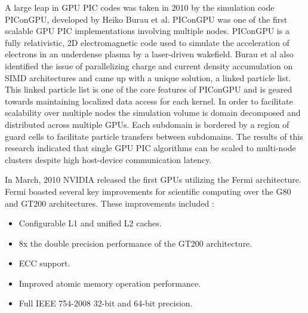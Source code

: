 A large leap in GPU PIC codes was taken in 2010 by the simulation code PIConGPU, developed by Heiko Burau et al. PIConGPU was one of the first scalable GPU PIC implementations involving multiple nodes. PIConGPU is a fully relativistic, 2D electromagnetic code used to simulate the acceleration of electrons in an underdense plasma by a laser-driven wakefield. Burau et al also identified the issue of parallelizing charge and current density accumulation on SIMD architectures and came up with a unique solution, a linked particle list. This linked particle list is one of the core features of PIConGPU and is geared towards maintaining localized data access for each kernel. In order to facilitate scalability over multiple nodes the simulation volume is domain decomposed and distributed across multiple GPUs. Each subdomain is bordered by a region of guard cells to facilitate particle transfers between subdomains. The results of this research indicated that single GPU PIC algorithms can be scaled to multi-node clusters despite high host-device communication latency.\cite{Burau2010}

In March, 2010 NVIDIA released the first GPUs utilizing the Fermi architecture. Fermi boasted several key improvements for scientific computing over the G80 and GT200 architectures. These improvements included \cite{NVIDIACorporation2009}:

\begin{itemize}
\singlespacing
\item Configurable L1 and unified L2 caches.
\item 8x the double precision performance of the GT200 architecture. 
\item ECC support. 
\item Improved atomic memory operation performance.
\item Full IEEE 754-2008 32-bit and 64-bit precision. 
\end{itemize}

